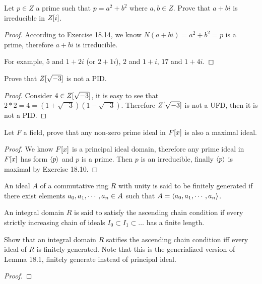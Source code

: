 \documentclass[../main.tex]{subfiles}
\begin{document}
\setcounter{exercise}{18}
\begin{exercise}
  Let $p \in Z$ a prime such that $p = a^2 + b^2$ where $a, b \in Z$.
  Prove that $a + bi$ is irreducible in $\poly[i]{Z}$.
\end{exercise}
\begin{proof}
  According to Exercise 18.14, we know $N(a + bi) = a^2 + b^2 = p$ is a prime,
  therefore $a + bi$ is irreducible.

  For example, $5$ and $1 + 2i$ (or $2 + 1i$), $2$ and $1 + i$, $17$ and $1 + 4i$.
\end{proof}

\begin{exercise}
  Prove that $\poly[\sqrt{-3}]{Z}$ is not a PID.
\end{exercise}
\begin{proof}
  Consider $4 \in \poly[\sqrt{-3}]{Z}$, it is easy to see that
  $2 * 2 = 4 = (1 + \sqrt{-3})(1 - \sqrt{-3})$.
  Therefore $\poly[\sqrt{-3}]{Z}$ is not a UFD, then it is not a PID.
\end{proof}

\setcounter{exercise}{23}
\begin{exercise}
  Let $F$ a field, prove that any non-zero prime ideal in $\poly{F}$
  is also a maximal ideal.
\end{exercise}
\begin{proof}
  We know $\poly{F}$ is a principal ideal domain, therefore any prime ideal in $\poly{F}$
  has form $\cyc{p}$ and $p$ is a prime.
  Then $p$ is an irreducible, finally $\cyc{p}$ is maximal by Exercise 18.10.
\end{proof}

\setcounter{exercise}{36}
\begin{exercise}
  An ideal $A$ of a commutative ring $R$ with unity is said to be
  finitely generated if there exist elements $\join{a}{n} \in A$
  such that $A = \cyc{\join{a}{n}}$. \par
  An integral domain $R$ is said to satisfy the ascending chain condition
  if every strictly increasing chain of ideals
  $I_0 \subset I_1 \subset \dots$ has a finite length. \par
  Show that an integral domain $R$ satifies the ascending chain condition
  iff every ideal of $R$ is finitely generated.
  Note that this is the generialized version of Lemma 18.1, finitely generate instead of principal ideal.
\end{exercise}
\begin{proof}
  
\end{proof}
\end{document}

